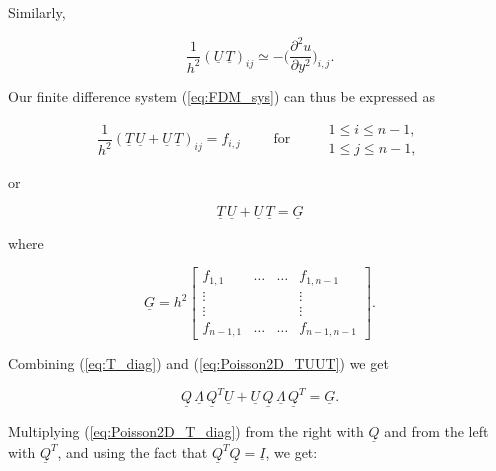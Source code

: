 \documentclass[11pt]{article}
\begin{document}
Similarly,

\begin{equation}
  \boxed{\frac{1}{h^2} (\underline{{U}} \, \underline{{T}})_{ij} \simeq -\biggl( \frac{\partial^2 u}{\partial y^2} \biggr)_{i,j}. }
\end{equation}
\vspace{.2in}

Our finite difference system (\ref{eq:FDM_sys}) can thus be expressed as

\begin{equation*}
  \frac{1}{h^2} ( \underline{{T}} \, \underline{{U}} + \underline{{U}} \, \underline{{T}})_{ij} = f_{i,j} \qquad \text{ for } \qquad
  \begin{matrix}
    1 \leq i \leq n-1, \\
    1 \leq j \leq n-1,
  \end{matrix}
\end{equation*}

or 

\begin{equation}
  \underline{{T}} \, \underline{{U}} + \underline{{U}} \, \underline{{T}} = \underline{{G}}
  \label{eq:Poisson2D_TUUT}
\end{equation}

where

\begin{equation*}
  \underline{{G}} = h^2
  \begin{bmatrix}
    f_{1,1} & \ldots & \ldots & f_{1,n-1} \\
    \vdots & & & \vdots \\
    \vdots & & & \vdots \\
    f_{n-1,1} & \ldots & \ldots & f_{n-1,n-1}
  \end{bmatrix} .
\end{equation*}

\newpage
Combining (\ref{eq:T_diag}) and (\ref{eq:Poisson2D_TUUT}) we get

\begin{equation}
  \underline{{Q}}\, \underline{{\Lambda}}\, \underline{{Q}}^T \underline{{U}} + \underline{{U}}\, \underline{{Q}}\, \underline{{\Lambda}} \,\underline{{Q}}^T = \underline{{G}}.
  \label{eq:Poisson2D_T_diag}
\end{equation}

Multiplying (\ref{eq:Poisson2D_T_diag}) from the right with $\underline{{Q}}$ and from the left with $\underline{{Q}}^T$, and using the fact that 
$\underline{Q}^T\underline{Q} = \underline{I}$, we get:
\end{document}
